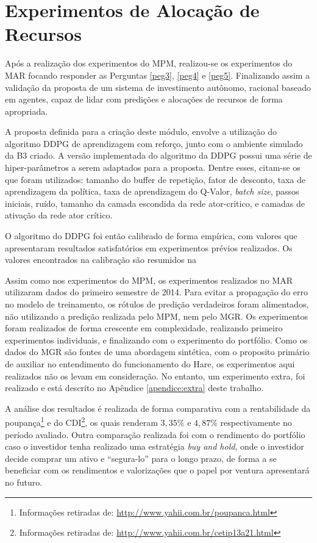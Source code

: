 \section{Experimentos de Alocação de Recursos}
\label{exp:mar}

Após a realização dos experimentos do \acrshort{MPM}, realizou-se os experimentos do \acrshort{MAR} focando responder as Perguntas \ref{peg3}, \ref{peg4} e \ref{peg5}. Finalizando assim a validação da proposta de um sistema de investimento autônomo, racional baseado em agentes, capaz de lidar com predições e alocações de recursos de forma apropriada. 

A proposta definida para a criação deste módulo, envolve a utilização do algoritmo \acrshort{DDPG} de aprendizagem com reforço, junto com o ambiente simulado da B3 criado. A versão implementada do algoritmo da \acrshort{DDPG} possui uma série de hiper-parâmetros a serem adaptados para a proposta. Dentre esses, citam-se os que foram utilizados: tamanho do buffer de repetição, fator de desconto, taxa de aprendizagem da política, taxa de aprendizagem do Q-Valor, \emph{batch size}, passos iniciais, ruído, tamanho da camada escondida da rede ator-critico, e camadas de ativação da rede ator crítico. 

O algoritmo do \acrshort{DDPG} foi então calibrado de forma empírica, com valores que apresentaram resultados satisfatórios em experimentos prévios realizados. Os valores encontrados na calibração são resumidos na 



Assim como nos experimentos do \acrshort{MPM}, os experimentos realizados no \acrshort{MAR} utilizaram dados do primeiro semestre de 2014. Para evitar a propagação do erro no modelo de treinamento, os rótulos de predição verdadeiros foram alimentados, não utilizando a predição realizada pelo \acrshort{MPM}, nem pelo \acrshort{MGR}. Os experimentos foram realizados de forma crescente em complexidade, realizando primeiro experimentos individuais, e finalizando com o experimento do portfólio. Como os dados do \acrshort{MGR} são fontes de uma abordagem sintética, com o proposito primário de auxiliar no entendimento do funcionamento do Hare, os experimentos aqui realizados não os levam em consideração. No entanto, um experimento extra, foi realizado e está descrito no Apêndice \ref{apendice:extra} deste trabalho.

A análise dos resultados é realizada de forma comparativa com a rentabilidade da poupança\footnote{Informações retiradas de: \url{http://www.yahii.com.br/poupanca.html}} e do \acrfull{CDI}\footnote{Informações retiradas de: \url{http://www.yahii.com.br/cetip13a21.html}}, os quais renderam $3,35\%$ e $4,87\%$ respectivamente no período avaliado. Outra comparação realizada foi com o rendimento do portfólio caso o investidor tenha realizado uma estratégia \emph{buy and hold}, onde o investidor decide comprar um ativo e ``segura-lo'' para o longo prazo, de forma a se beneficiar com os rendimentos e valorizações que o papel por ventura apresentará no futuro.

